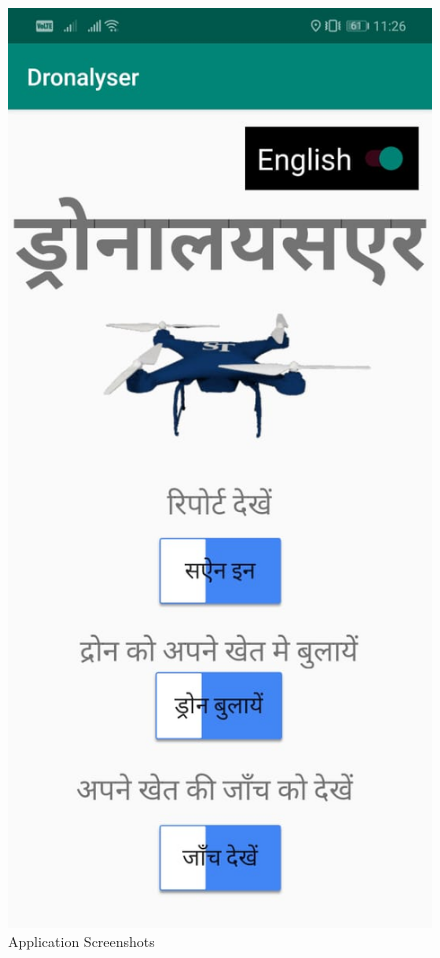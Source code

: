 \begin{figure}[H]
    \includegraphics[scale=0.17]{SummerInterReport/project/Images-Major/app5.jpeg}
    \caption{Application Screenshots}
    \label{fig:compEy}
\end{figure}


